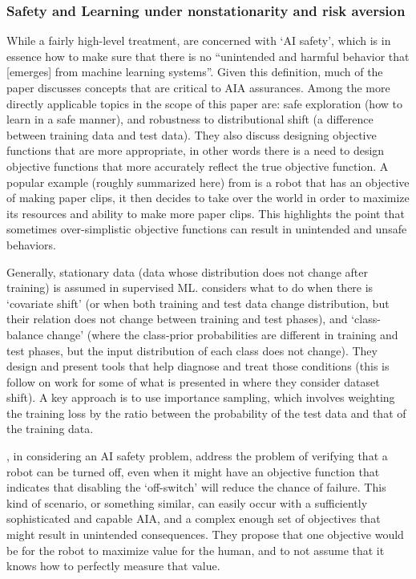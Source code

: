 \subsubsection{Safety and Learning under nonstationarity and risk aversion}
    While a fairly high-level treatment, \citet{Amodei2016-xi} are concerned with `AI safety', which is in essence how to make sure that there is no ``unintended and harmful behavior that [emerges] from machine learning systems''. Given this definition, much of the paper discusses concepts that are critical to AIA assurances. Among the more directly applicable topics in the scope of this paper are: safe exploration (how to learn in a safe manner), and robustness to distributional shift (a difference between training data and test data). They also discuss designing objective functions that are more appropriate, in other words there is a need to design objective functions that more accurately reflect the true objective function. A popular example (roughly summarized here) from \citet{Bostrom2014-fz} is a robot that has an objective of making paper clips, it then decides to take over the world in order to maximize its resources and ability to make more paper clips. This highlights the point that sometimes over-simplistic objective functions can result in unintended and unsafe behaviors.

    Generally, stationary data (data whose distribution does not change after training) is assumed in supervised ML. \citet{Sugiyama2013-ci} considers what to do when there is `covariate shift' (or when both training and test data change distribution, but their relation does not change between training and test phases), and `class-balance change' (where the class-prior probabilities are different in training and test phases, but the input distribution of each class does not change). They design and present tools that help diagnose and treat those conditions (this is follow on work for some of what is presented in \citet{Quinonero-Candela2009-fj} where they consider dataset shift). A key approach is to use importance sampling, which involves weighting the training loss by the ratio between the probability of the test data and that of the training data.

    \citet{Hadfield-Menell2016-ws}, in considering an AI safety problem, address the problem of verifying that a robot can be turned off, even when it might have an objective function that indicates that disabling the `off-switch' will reduce the chance of failure. This kind of scenario, or something similar, can easily occur with a sufficiently sophisticated and capable AIA, and a complex enough set of objectives that might result in unintended consequences. They propose that one objective would be for the robot to maximize value for the human, and to not assume that it knows how to perfectly measure that value. 

